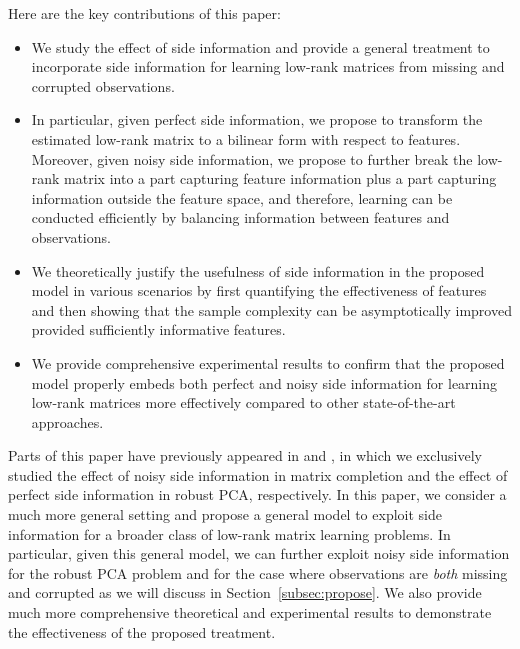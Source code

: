 \documentclass[twoside,11pt]{article}
\begin{document}
Here are the key contributions of this paper:
\begin{itemize}
  \item We study the effect of side information and provide a general treatment
    to incorporate side information for learning low-rank matrices
    from missing and corrupted observations.

  \item In particular, given perfect side information, we propose to
  transform the estimated low-rank matrix to
  a bilinear form with respect to features.  Moreover, given noisy side information,
  we propose to further break the low-rank matrix into a part capturing feature
  information plus a part capturing information outside the feature space,
  and therefore, learning can be
  conducted efficiently by balancing information between features and observations.


  \item We theoretically justify the usefulness of side information in the proposed
    model in various scenarios %
    by first quantifying the effectiveness of features and then showing
    that the sample complexity can be asymptotically improved provided sufficiently
    informative features.


  \item We provide comprehensive experimental results to confirm that the
  proposed model properly embeds both perfect and noisy side information
  for learning low-rank matrices more effectively compared
  to other state-of-the-art approaches.

\end{itemize}
Parts of this paper have previously appeared in \citet{Chiang15a} and \citet{Chiang16a},
in which we exclusively studied the effect of noisy side information in matrix completion and
the effect of perfect side information in robust PCA, respectively.  In this paper, we
consider a much more general setting and propose a general model
to exploit side information for a broader class of low-rank matrix learning problems.
In particular, given this general model, we can
further exploit noisy side information for the robust PCA problem and
for the case where observations are {\it both} missing and corrupted
as we will discuss in Section~\ref{subsec:propose}.
We also provide much more
comprehensive theoretical and experimental results to demonstrate
the effectiveness of the proposed treatment.
\end{document}
